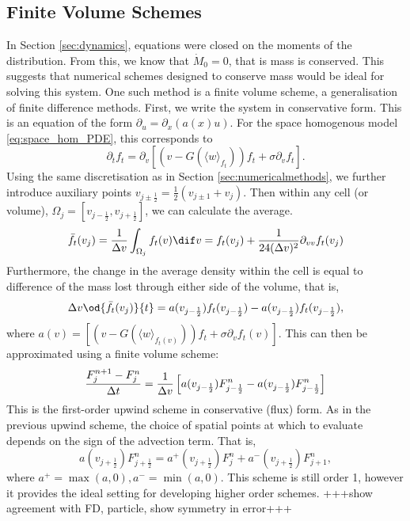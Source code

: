     \subsection{Finite Volume Schemes}
    In Section \ref{sec:dynamics}, equations were closed on the moments of the distribution. From this, we know that \(\dot{M}_0 = 0\), that is mass is conserved. This suggests that numerical schemes designed to conserve mass would be ideal for solving this system. One such method is a finite volume scheme, a generalisation of finite difference methods. First, we write the system in conservative form. This is an equation of the form $\partial_ u = \partial_x(a(x)u)$. For the space homogenous model \eqref{eq:space_hom_PDE}, this corresponds to
    \begin{equation}\label{eq:flux_space_hom}
    \partial_t f_t = \partial_v \left[\left(v-G(\langle w \rangle_{f_t})\right)f_t + \sigma \partial_v f_t \right].
    \end{equation}
    Using the same discretisation as in Section \ref{sec:numericalmethods}, we further introduce auxiliary points $v_{j\pm\frac{1}{2}} = \frac{1}{2}(v_{j\pm1} + v_j) $. Then within any cell (or volume), $\Omega_j = [v_{j-\frac{1}{2}}, v_{j+\frac{1}{2}}]$, we can calculate the average.
    \[
    \bar{f}_t(v_j) = \frac{1}{\Dv}\int_{\Omega_j} f_t(v) \dif v = f_t(v_j)+\frac{1}{24(\Dv)^2} \partial_{vv} f_t(v_j)
    \]
    Furthermore, the change in the average density within the cell is equal to difference of the mass lost through either side of the volume, that is,
    \[
    \Dv\od{\bar{f}_t(v_j)}{t} = a(v_{j-\frac{1}{2}})f_t(v_{j-\frac{1}{2}}) - a(v_{j-\frac{1}{2}})f_t(v_{j-\frac{1}{2}}), 
    \]
    where $a(v) = \left[\left(v-G(\langle w \rangle_{f_t(v)})\right)f_t + \sigma \partial_v f_t(v) \right]$. This can then be approximated using a finite volume scheme:
    \[
    \frac{F^{n+1}_j - F^n_j}{\Delta t} = \frac{1}{\Delta v}\left[ a(v_{j-\frac{1}{2}})F^n_{j-\frac{1}{2}} - a(v_{j-\frac{1}{2}})F^n_{j-\frac{1}{2}}\right]
    \]
    This is the first-order upwind scheme in conservative (flux) form. As in the previous upwind scheme, the choice of spatial points at which to evaluate depends on the sign of the advection term. That is,
    \[
    a(v_{j+\frac{1}{2}})F^n_{j+\frac{1}{2}} = a^+(v_{j+\frac{1}{2}})F^n_{j} + a^-(v_{j+\frac{1}{2}})F^n_{j+1},
    \]
    where $a^+ = \max(a,0), a^- = \min(a,0)$.  This scheme is still order 1, however it provides the ideal setting for developing higher order schemes.
    +++show agreement with FD, particle,  show symmetry in error+++ 
    
    